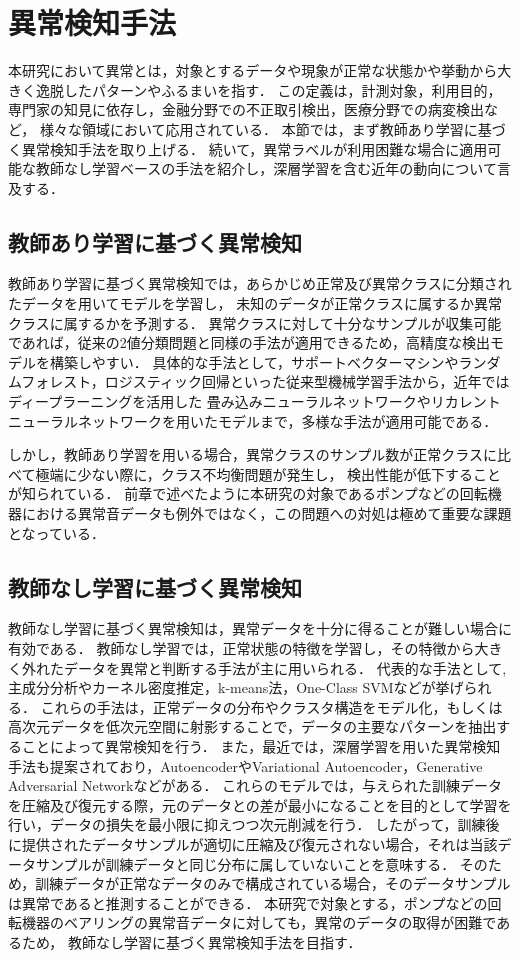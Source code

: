 \documentclass[../main]{subfiles}
\begin{document}
\section{異常検知手法}
\label{sec:related_work_anomaly}
本研究において異常とは，対象とするデータや現象が正常な状態かや挙動から大きく逸脱したパターンやふるまいを指す．
この定義は，計測対象，利用目的，専門家の知見に依存し，金融分野での不正取引検出，医療分野での病変検出など，
様々な領域において応用されている．
本節では，まず教師あり学習に基づく異常検知手法を取り上げる．
続いて，異常ラベルが利用困難な場合に適用可能な教師なし学習ベースの手法を紹介し，深層学習を含む近年の動向について言及する．
\subsection{教師あり学習に基づく異常検知}
教師あり学習に基づく異常検知では，あらかじめ正常及び異常クラスに分類されたデータを用いてモデルを学習し，
未知のデータが正常クラスに属するか異常クラスに属するかを予測する．
異常クラスに対して十分なサンプルが収集可能であれば，従来の2値分類問題と同様の手法が適用できるため，高精度な検出モデルを構築しやすい．
具体的な手法として，サポートベクターマシンやランダムフォレスト，ロジスティック回帰といった従来型機械学習手法から，近年ではディープラーニングを活用した
畳み込みニューラルネットワークやリカレントニューラルネットワークを用いたモデルまで，多様な手法が適用可能である．

しかし，教師あり学習を用いる場合，異常クラスのサンプル数が正常クラスに比べて極端に少ない際に，クラス不均衡問題が発生し，
検出性能が低下することが知られている．
前章で述べたように本研究の対象であるポンプなどの回転機器における異常音データも例外ではなく，この問題への対処は極めて重要な課題となっている．

\subsection{教師なし学習に基づく異常検知}
教師なし学習に基づく異常検知は，異常データを十分に得ることが難しい場合に有効である．
教師なし学習では，正常状態の特徴を学習し，その特徴から大きく外れたデータを異常と判断する手法が主に用いられる．
代表的な手法として, 主成分分析やカーネル密度推定，k-means法，One-Class SVMなどが挙げられる．
これらの手法は，正常データの分布やクラスタ構造をモデル化，もしくは高次元データを低次元空間に射影することで，データの主要なパターンを抽出することによって異常検知を行う．
また，最近では，深層学習を用いた異常検知手法も提案されており，AutoencoderやVariational Autoencoder，Generative Adversarial Networkなどがある．
これらのモデルでは，与えられた訓練データを圧縮及び復元する際，元のデータとの差が最小になることを目的として学習を行い，データの損失を最小限に抑えつつ次元削減を行う．
したがって，訓練後に提供されたデータサンプルが適切に圧縮及び復元されない場合，それは当該データサンプルが訓練データと同じ分布に属していないことを意味する．
そのため，訓練データが正常なデータのみで構成されている場合，そのデータサンプルは異常であると推測することができる．
本研究で対象とする，ポンプなどの回転機器のベアリングの異常音データに対しても，異常のデータの取得が困難であるため，
教師なし学習に基づく異常検知手法を目指す．
\end{document}
